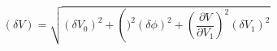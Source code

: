 \begin{equation}
\label{eq:delta_V_Malus}
\left(\delta V\right) = \sqrt{ (\delta V_0)^2 + \left( )^2 (\delta \phi)^2 + \left( \frac{\partial{V}}{\partial{V_1}}\right)^2 (\delta V_1)^2}
\end{equation}